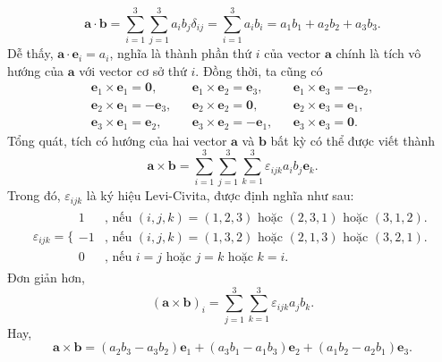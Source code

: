 \begin{equation}
    \mathbf{a}\cdot\mathbf{b}= \sum_{i=1}^{3}\sum_{j=1}^{3}a_i b_j \delta_{ij}= \sum_{i=1}^{3} a_i b_i = a_1 b_1 + a_2 b_2 + a_3 b_3.
\end{equation} Dễ thấy, \(\mathbf{a} \cdot \mathbf{e}_i =a_i\), nghĩa là thành phần thứ \(i\) của vector \(\mathbf{a}\) chính là tích vô hướng của \(\mathbf{a}\) với vector cơ sở thứ \(i\).
Đồng thời, ta cũng có 
\begin{align*}
\mathbf{e}_1 \times \mathbf{e}_1 = \mathbf{0},    && \mathbf{e}_1 \times \mathbf{e}_2 = \mathbf{e}_3,  && \mathbf{e}_1 \times \mathbf{e}_3 = -\mathbf{e}_2, \\
\mathbf{e}_2 \times \mathbf{e}_1 = -\mathbf{e}_3, && \mathbf{e}_2 \times \mathbf{e}_2 = \mathbf{0},    && \mathbf{e}_2 \times \mathbf{e}_3 = \mathbf{e}_1, \\
\mathbf{e}_3 \times \mathbf{e}_1 = \mathbf{e}_2,  && \mathbf{e}_3 \times \mathbf{e}_2 = -\mathbf{e}_1, && \mathbf{e}_3 \times \mathbf{e}_3 = \mathbf{0}.
\end{align*}
Tổng quát, tích có hướng của hai vector \(\mathbf{a}\) và \(\mathbf{b}\) bất kỳ có thể được viết thành
\begin{equation}
    \mathbf{a} \times \mathbf{b} = \sum_{i=1}^{3}\sum_{j=1}^{3}\sum_{k=1}^{3}\varepsilon_{ijk} a_i b_j  \mathbf{e}_k.
\end{equation}
Trong đó, \(\varepsilon_{ijk}\) là ký hiệu Levi-Civita, được định nghĩa như sau:
\begin{equation*}
\begin{array}{l}
        \varepsilon_{ijk}=\Bigg\{
        \begin{array}{ll}
        1  & \text{, nếu } (i,j,k)=(1,2,3) \text{ hoặc } (2,3,1) \text{ hoặc } (3,1,2).\\
        -1 & \text{, nếu } (i,j,k)=(1,3,2) \text{ hoặc } (2,1,3) \text{ hoặc } (3,2,1).\\
        0  & \text{, nếu } i=j \text{ hoặc } j=k \text{ hoặc } k=i.
        \end{array}
\end{array}
\end{equation*}  Đơn giản hơn, \[(\mathbf{a}\times\mathbf{b})_i = \sum_{j=1}^{3}\sum_{k=1}^{3}\varepsilon_{ijk}a_j b_k.\] Hay, 
\begin{equation}
    \mathbf{a}\times\mathbf{b}=(a_2 b_3 - a_3 b_2)\mathbf{e}_1 + (a_3 b_1 - a_1 b_3)\mathbf{e}_2 + (a_1 b_2 - a_2 b_1)\mathbf{e}_3.
\end{equation}

